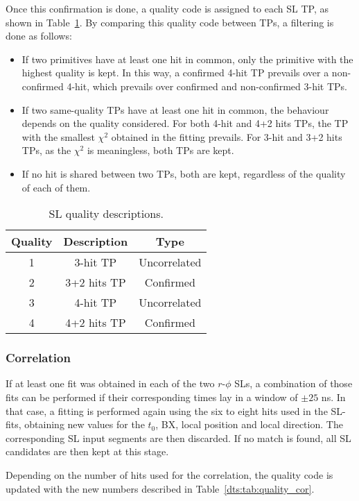 \documentclass[../main.tex]{subfiles}
\begin{document}
Once this confirmation is done, a quality code is assigned to each SL TP, as shown in Table~\ref{dts:tab:quality_sl}. By comparing this quality code between TPs, a filtering is done as follows:

\begin{itemize}
\item If two primitives have at least one hit in common, only the primitive with the highest quality is kept. In this way, a confirmed 4-hit TP prevails over a non-confirmed 4-hit, which prevails over confirmed and non-confirmed 3-hit TPs.
\item If two same-quality TPs have at least one hit in common, the behaviour depends on the quality considered. For both 4-hit and 4+2 hits TPs, the TP with the smallest $\chi^2$ obtained in the fitting prevails. For 3-hit and 3+2 hits TPs, as the $\chi^2$ is meaningless, both TPs are kept.
\item If no hit is shared between two TPs, both are kept, regardless of the quality of each of them.
\end{itemize}

\begin{table}[h!]
	\centering
	\begin{tabular}{c|c|c}
		Quality & Description & Type \\\hline
		1 & 3-hit TP & Uncorrelated \\
		2 & 3+2 hits TP & Confirmed \\
		3 & 4-hit TP & Uncorrelated \\
		4 & 4+2 hits TP & Confirmed
	\end{tabular}
	\caption{SL quality descriptions.}
	\label{dts:tab:quality_sl}
\end{table}


\subsubsection*{Correlation}

If at least one fit was obtained in each of the two $r$-$\phi$ SLs, a combination of those fits can be performed if their corresponding times lay in a window of $\pm 25$ ns. In that case, a fitting is performed again using the six to eight hits used in the SL-fits, obtaining new values for the $t_0$, BX, local position and local direction. The corresponding SL input segments are then discarded. If no match is found, all SL candidates are then kept at this stage. 

Depending on the number of hits used for the correlation, the quality code is updated with the new numbers described in Table~\ref{dts:tab:quality_cor}.
\end{document}
